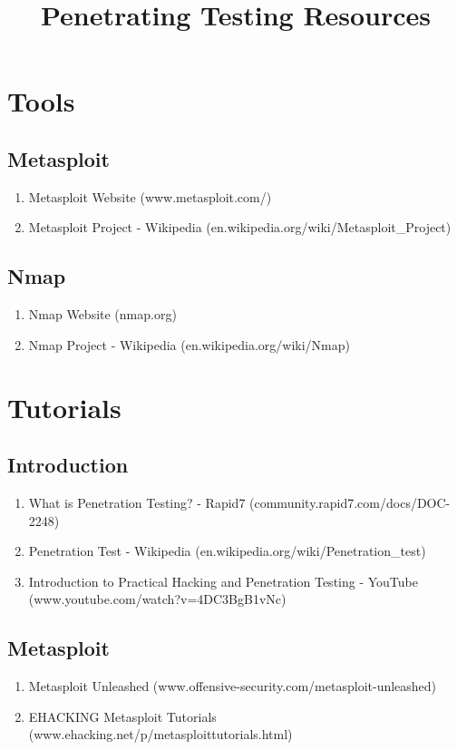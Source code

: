 \documentclass[a4paper]{article}
\title{Penetrating Testing Resources}
\date{}
\begin{document}
\maketitle


\section{Tools}

\subsection{Metasploit}
\begin{enumerate}
	\item Metasploit Website (www.metasploit.com/)
	\item Metasploit Project - Wikipedia (en.wikipedia.org/wiki/Metasploit\_Project)
\end{enumerate}

\subsection{Nmap}
\begin{enumerate}
	\item Nmap Website (nmap.org)
	\item Nmap Project - Wikipedia (en.wikipedia.org/wiki/Nmap)
\end{enumerate}


\section{Tutorials}

\subsection{Introduction}
\begin{enumerate}
	\item What is Penetration Testing? - Rapid7 (community.rapid7.com/docs/DOC-2248)
	\item Penetration Test - Wikipedia (en.wikipedia.org/wiki/Penetration\_test)
    \item Introduction to Practical Hacking and Penetration Testing - YouTube 		 	\\(www.youtube.com/watch?v=4DC3BgB1vNc)
\end{enumerate}

\subsection{Metasploit}
\begin{enumerate}
	\item Metasploit Unleashed (www.offensive-security.com/metasploit-unleashed)
	\item EHACKING Metasploit Tutorials (www.ehacking.net/p/metasploittutorials.html)
\end{enumerate}
	
\end{document}
